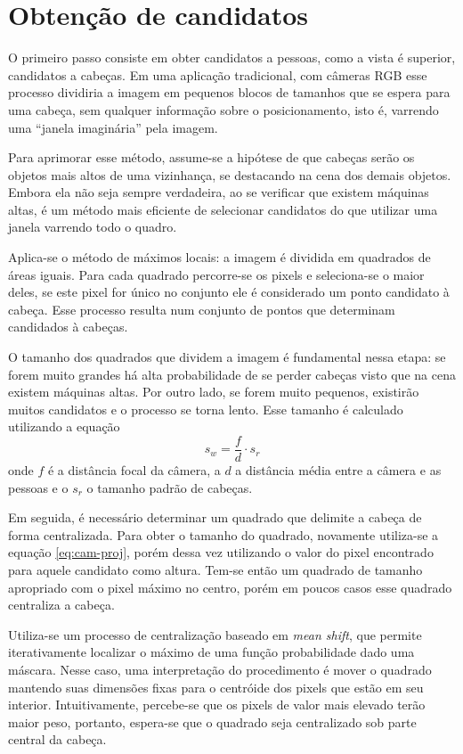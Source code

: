 \section{Obtenção de candidatos}
\label{sec:tradicional-candidatos}
O primeiro passo consiste em obter candidatos a pessoas, como a vista é superior, candidatos a cabeças. Em uma aplicação tradicional, com câmeras RGB esse processo dividiria a imagem em pequenos blocos de tamanhos que se espera para uma cabeça, sem qualquer informação sobre o posicionamento, isto é, varrendo uma ``janela imaginária'' pela imagem.

Para aprimorar esse método, assume-se a hipótese de que cabeças serão os objetos mais altos de uma vizinhança, se destacando na cena dos demais objetos. Embora ela não seja sempre verdadeira, ao se verificar que existem máquinas altas, é um método mais eficiente de selecionar candidatos do que utilizar uma janela varrendo todo o quadro.

Aplica-se o método de máximos locais: a imagem é dividida em quadrados de áreas iguais. Para cada quadrado percorre-se os pixels e seleciona-se o maior deles, se este pixel for único no conjunto ele é considerado um ponto candidato à cabeça. Esse processo resulta num conjunto de pontos que determinam candidados à cabeças.

O tamanho dos quadrados que dividem a imagem é fundamental nessa etapa: se forem muito grandes há alta probabilidade de se perder cabeças visto que na cena existem máquinas altas. Por outro lado, se forem muito pequenos, existirão muitos candidatos e o processo se torna lento. Esse tamanho é calculado \cite{rauter} utilizando a equação 
\begin{equation}
	\label{eq:cam-proj}
	s_w = \frac{f}{d} \cdot s_r
\end{equation}
 onde $f$ é a distância focal da câmera, a $d$ a distância média entre a câmera e as pessoas e o $s_r$ o tamanho padrão de cabeças.

Em seguida, é necessário determinar um quadrado que delimite a cabeça de forma centralizada. Para obter o tamanho do quadrado, novamente utiliza-se a equação \eqref{eq:cam-proj}, porém dessa vez utilizando o valor do pixel encontrado para aquele candidato como altura. Tem-se então um quadrado de tamanho apropriado com o pixel máximo no centro, porém em poucos casos esse quadrado centraliza a cabeça.

Utiliza-se um processo de centralização baseado em \textit{mean shift}, que permite iterativamente localizar o máximo de uma função probabilidade dado uma máscara. Nesse caso, uma interpretação do procedimento é mover o quadrado mantendo suas dimensões fixas para o centróide dos pixels que estão em seu interior. Intuitivamente, percebe-se que os pixels de valor mais elevado terão maior peso, portanto, espera-se que o quadrado seja centralizado sob parte central da cabeça.

